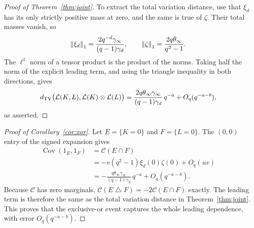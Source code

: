 \begin{proof}[Proof of Theorem~\ref{thm:joint}]
To extract the total variation distance, use that $\xi_d$ has its only
strictly positive mass at zero, and the same is true of $\zeta$.
Their total masses vanish, so
\[
 \left\|\xi_d\right\|_1
  =\frac{2q^{-d}\gamma_\infty}{(q-1)\gamma_d},\qquad
 \left\|\zeta\right\|_1
  =\frac{2q\theta_\infty}{q^2-1}.
\]
The $\ell^1$ norm of a tensor product is the product of the norms.
Taking half the norm of the explicit leading term, and using the
triangle inequality in both directions, gives
\[
 d_{\mathrm{TV}}\bigl(\mathcal L(K,L),\mathcal L(K)\otimes\mathcal L(L)\bigr)
 =\frac{2q\theta_\infty\gamma_\infty}{(q-1)\gamma_d}\,q^{-a}
   +O_q(q^{-a-b}),
\]
as asserted.
\end{proof}

\begin{proof}[Proof of Corollary~\ref{cor:xor}]
Let $E=\{K=0\}$ and $F=\{L=0\}$. The $(0,0)$ entry of the signed
expansion gives
\begin{align*}
 \operatorname{Cov}(1_E,1_F)
 &=\mathcal C(E\cap F)\\
 &=-v(q^2-1)\xi_d(0)\zeta(0)+O_q(uv)\\
 &=-\frac{q\theta_\infty\gamma_\infty}{(q-1)\gamma_d}\,q^{-a}
   +O_q(q^{-a-b}).
\end{align*}
Because $\mathcal C$ has zero marginals,
$\mathcal C(E\mathbin{\triangle}F)=-2\mathcal C(E\cap F)$ exactly.
The leading term is therefore the same as the total variation distance
in Theorem~\ref{thm:joint}. This proves that the exclusive-or event
captures the whole leading dependence, with error $O_q(q^{-a-b})$.
\end{proof}
